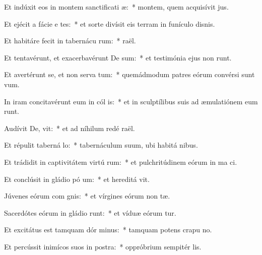 \item Et indúxit eos in montem sanctificati æ:~* montem, quem acquisívit  jus.
\item Et ejécit a fácie e tes:~* et sorte divísit eis terram in funículo disnis.
\item Et habitáre fecit in tabernácu rum:~*  raël.
\item Et tentavérunt, et exacerbavérunt De sum:~* et testimónia ejus non runt.
\item Et avertérunt se, et non serva tum:~* quemádmodum patres eórum convérsi sunt   vum.
\item In iram concitavérunt eum in cól is:~* et in sculptílibus suis ad æmulatiónem eum runt.
\item Audívit De,  vit:~* et ad níhilum redé  raël.
\item Et répulit taberná lo:~* tabernáculum suum, ubi habitá  nibus.
\item Et trádidit in captivitátem virtú rum:~* et pulchritúdinem eórum in ma ci.
\item Et conclúsit in gládio pó um:~* et hereditá  vit.
\item Júvenes eórum com gnis:~* et vírgines eórum non  tæ.
\item Sacerdótes eórum in gládio runt:~* et víduæ eórum  tur.
\item Et excitátus est tamquam dór minus:~* tamquam potens crapu  no.
\item Et percússit inimícos suos in postra:~* oppróbrium sempitér  lis.
